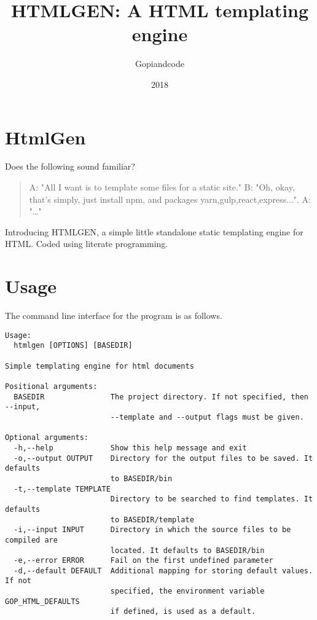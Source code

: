 \documentclass[11pt]{article}
\date{2018}
\title{HTMLGEN: A HTML templating engine}
\author{Gopiandcode}
\begin{document}
\maketitle

\tableofcontents

\section{HtmlGen}
\label{sec:org815a168}
Does the following sound familiar?
\begin{quote}
A: "All I want is to template some files for a static site."\newline
B: "Oh, okay, that's simply, just install npm, and packages \newline
yarn,gulp,react,express...".\newline
A: "\ldots{}"
\end{quote}

Introducing HTMLGEN, a simple little standalone static templating engine for
HTML. Coded using literate programming.

\section{Usage}
\label{sec:org3176d48}
The command line interface for the program is as follows.
\begin{verbatim}
Usage:
  htmlgen [OPTIONS] [BASEDIR]

Simple templating engine for html documents

Positional arguments:
  BASEDIR               The project directory. If not specified, then --input,
                        --template and --output flags must be given.

Optional arguments:
  -h,--help             Show this help message and exit
  -o,--output OUTPUT    Directory for the output files to be saved. It defaults
                        to BASEDIR/bin
  -t,--template TEMPLATE
                        Directory to be searched to find templates. It defaults
                        to BASEDIR/template
  -i,--input INPUT      Directory in which the source files to be compiled are
                        located. It defaults to BASEDIR/bin
  -e,--error ERROR      Fail on the first undefined parameter
  -d,--default DEFAULT  Additional mapping for storing default values. If not 
                        specified, the environment variable GOP_HTML_DEFAULTS
                        if defined, is used as a default.
\end{verbatim}
\end{document}
